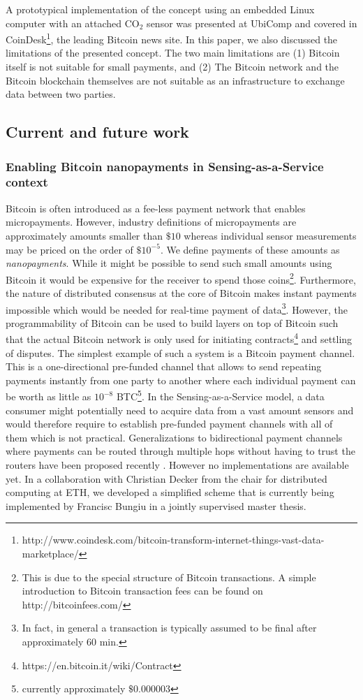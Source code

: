 \documentclass[a4paper, 12pt]{scrartcl}
\begin{document}
A prototypical implementation of the concept using an embedded Linux computer with an attached CO$_{2}$ sensor was presented at UbiComp \parencite{Worner:2014:YSE:2638728.2638786} and covered in CoinDesk\footnote{http://www.coindesk.com/bitcoin-transform-internet-things-vast-data-marketplace/}, the leading Bitcoin news site. In this paper, we also discussed the limitations of the presented concept. The two main limitations are (1) Bitcoin itself is not suitable for small payments, and (2) The Bitcoin network and the Bitcoin blockchain themselves are not suitable as an infrastructure to exchange data between two parties.

\subsection{Current and future work}

\subsubsection{Enabling Bitcoin nanopayments in Sensing-as-a-Service context}

Bitcoin is often introduced as a fee-less payment network that enables micropayments. However, industry definitions of micropayments are approximately amounts smaller than $\$10$ whereas individual sensor measurements may be priced on the order of $\$10^{-5}$. We define payments of these amounts as \textit{nanopayments}. While it might be possible to send such small amounts using Bitcoin it would be expensive for the receiver to spend those coins\footnote{This is due to the special structure of Bitcoin transactions. A simple introduction to Bitcoin transaction fees can be found on http://bitcoinfees.com/}. Furthermore, the nature of distributed consensus at the core of Bitcoin makes instant payments impossible which would be needed for real-time payment of data\footnote{In fact, in general a transaction is typically assumed to be final after approximately 60 min.}. However, the programmability of Bitcoin can be used to build layers on top of Bitcoin such that the actual Bitcoin network is only used for initiating contracts\footnote{https://en.bitcoin.it/wiki/Contract} and settling of disputes. The simplest example of such a system is a Bitcoin payment channel. This is a one-directional pre-funded channel that allows to send repeating payments instantly from one party to another where each individual payment can be worth as little as $10^{-8}$ BTC\footnote{currently approximately $\$0.000003$}. In the Sensing-as-a-Service model, a data consumer might potentially need to acquire data from a vast amount sensors and would therefore require to establish pre-funded payment channels with all of them which is not practical. Generalizations to bidirectional payment channels where payments can be routed through multiple hops without having to trust the routers have been proposed recently \parencite{poonbitcoin,decker2015Duplex}. However no implementations are available yet. In a collaboration with Christian Decker from the chair for distributed computing at ETH, we developed a simplified scheme that is currently being implemented by Francisc Bungiu in a jointly supervised master thesis.
\end{document}
